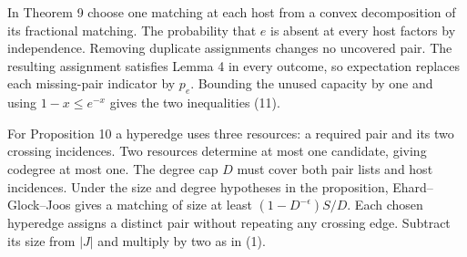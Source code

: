 \documentclass[english,11pt,a4paper]{article}
\begin{document}
In Theorem 9 choose one matching at each host from a convex decomposition of its fractional matching. The probability that \(e\) is absent at every host factors by independence. Removing duplicate assignments changes no uncovered pair. The resulting assignment satisfies Lemma 4 in every outcome, so expectation replaces each missing-pair indicator by \(p_e\). Bounding the unused capacity by one and using \(1-x\le e^{-x}\) gives the two inequalities (11).

For Proposition 10 a hyperedge uses three resources: a required pair and its two crossing incidences. Two resources determine at most one candidate, giving codegree at most one. The degree cap \(D\) must cover both pair lists and host incidences. Under the size and degree hypotheses in the proposition, Ehard--Glock--Joos gives a matching of size at least \((1-D^{-\epsilon})S/D\). Each chosen hyperedge assigns a distinct pair without repeating any crossing edge. Subtract its size from \(|J|\) and multiply by two as in (1).
\end{document}
